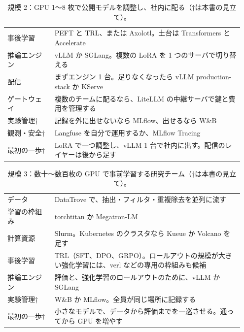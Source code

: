 \begin{table}[H]
\centering\footnotesize
\caption{規模 2：GPU 1〜8 枚で公開モデルを調整し、社内に配る（†は本書の見立て）。}
\label{tab:tm-scale2}
\begin{tabular}{@{}>{\raggedright\arraybackslash}p{0.19\linewidth}>{\raggedright\arraybackslash}p{0.76\linewidth}@{}}
\toprule
事後学習 & PEFT と TRL、または Axolotl。土台は Transformers と Accelerate \\
推論エンジン & vLLM か SGLang。複数の LoRA を 1 つのサーバで切り替える \\
配信 & まずエンジン 1 台。足りなくなったら vLLM production-stack か KServe \\
ゲートウェイ & 複数のチームに配るなら、LiteLLM の中継サーバで鍵と費用を管理する \\
実験管理† & 記録を外に出せないなら MLflow、出せるなら W\&B \\
観測・安全† & Langfuse を自分で運用するか、MLflow Tracing \\
最初の一歩† & LoRA で一つ調整し、vLLM 1 台で社内に出す。配信のレイヤーは後から足す \\
\bottomrule
\end{tabular}
\end{table}

\begin{table}[H]
\centering\footnotesize
\caption{規模 3：数十〜数百枚の GPU で事前学習する研究チーム（†は本書の見立て）。}
\label{tab:tm-scale3}
\begin{tabular}{@{}>{\raggedright\arraybackslash}p{0.19\linewidth}>{\raggedright\arraybackslash}p{0.76\linewidth}@{}}
\toprule
データ & DataTrove で、抽出・フィルタ・重複除去を並列に流す \\
学習の枠組み & torchtitan か Megatron-LM \\
計算資源 & Slurm。Kubernetes のクラスタなら Kueue か Volcano を足す \\
事後学習 & TRL（SFT、DPO、GRPO）。ロールアウトの規模が大きい強化学習には、verl などの専用の枠組みも候補 \\
推論エンジン & 評価と、強化学習のロールアウトのために、vLLM か SGLang \\
実験管理† & W\&B か MLflow。全員が同じ場所に記録する \\
最初の一歩† & 小さなモデルで、データから評価までを一巡させる。通ってから GPU を増やす \\
\bottomrule
\end{tabular}
\end{table}

